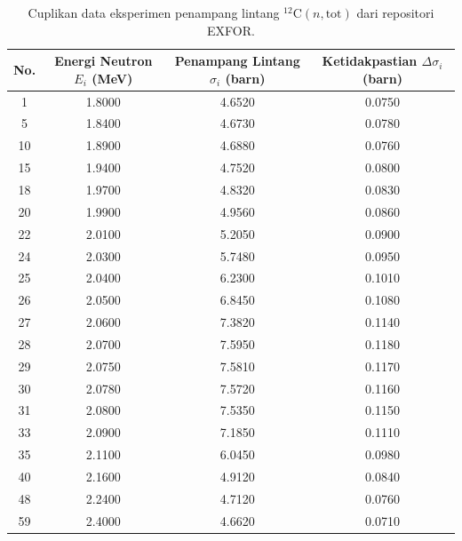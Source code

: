 \begin{table}[H]
    \centering
    \footnotesize
    \setlength{\tabcolsep}{6pt}
    \caption{Cuplikan data eksperimen penampang lintang $^{12}\text{C}(n,\text{tot})$ dari repositori EXFOR.}
    \label{tab:data_exfor}
    \begin{tabular}{c S[table-format=1.4] S[table-format=1.4] S[table-format=1.4]}
        \toprule
        {No.} & {Energi Neutron $E_i$ (\si{\mega\electronvolt})} & {Penampang Lintang $\sigma_i$ (barn)} & {Ketidakpastian $\Delta\sigma_i$ (barn)} \\
          & 1.8000 & 4.6520 & 0.0750 \\
        5  & 1.8400 & 4.6730 & 0.0780 \\
        10 & 1.8900 & 4.6880 & 0.0760 \\
        15 & 1.9400 & 4.7520 & 0.0800 \\
        18 & 1.9700 & 4.8320 & 0.0830 \\
        20 & 1.9900 & 4.9560 & 0.0860 \\
        22 & 2.0100 & 5.2050 & 0.0900 \\
        24 & 2.0300 & 5.7480 & 0.0950 \\
        25 & 2.0400 & 6.2300 & 0.1010 \\
        26 & 2.0500 & 6.8450 & 0.1080 \\
        27 & 2.0600 & 7.3820 & 0.1140 \\
        28 & 2.0700 & 7.5950 & 0.1180 \\
        29 & 2.0750 & 7.5810 & 0.1170 \\
        30 & 2.0780 & 7.5720 & 0.1160 \\
        31 & 2.0800 & 7.5350 & 0.1150 \\
        33 & 2.0900 & 7.1850 & 0.1110 \\
        35 & 2.1100 & 6.0450 & 0.0980 \\
        40 & 2.1600 & 4.9120 & 0.0840 \\
        48 & 2.2400 & 4.7120 & 0.0760 \\
        59 & 2.4000 & 4.6620 & 0.0710 \\
        \bottomrule
    \end{tabular}
\end{table}

